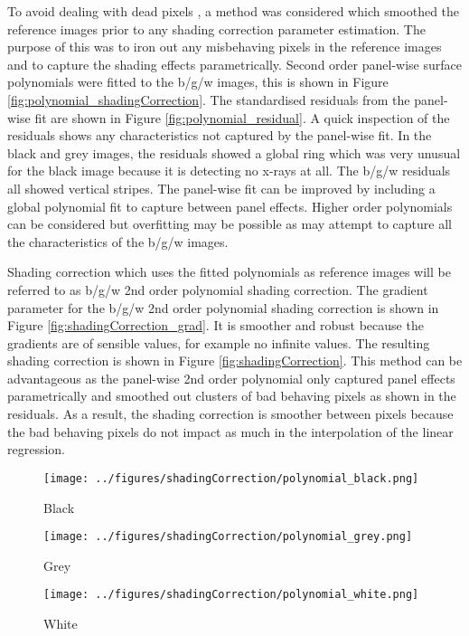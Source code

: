 \documentclass[a4paper]{proc}
\begin{document}
To avoid dealing with dead pixels \cite{brettschneider2014spatial}, a method was considered which smoothed the reference images prior to any shading correction parameter estimation. The purpose of this was to iron out any misbehaving pixels in the reference images and to capture the shading effects parametrically. Second order panel-wise surface polynomials were fitted to the b/g/w images, this is shown in Figure \ref{fig:polynomial_shadingCorrection}. The standardised residuals from the panel-wise fit are shown in Figure \ref{fig:polynomial_residual}. A quick inspection of the residuals shows any characteristics not captured by the panel-wise fit. In the black and grey images, the residuals showed a global ring which was very unusual for the black image because it is detecting no x-rays at all. The b/g/w residuals all showed vertical stripes. The panel-wise fit can be improved by including a global polynomial fit to capture between panel effects. Higher order polynomials can be considered but overfitting may be possible as may attempt to capture all the characteristics of the b/g/w images.

Shading correction which uses the fitted polynomials as reference images will be referred to as b/g/w 2nd order polynomial shading correction. The gradient parameter for the b/g/w 2nd order polynomial shading correction is shown in Figure \ref{fig:shadingCorrection_grad}. It is smoother and robust because the gradients are of sensible values, for example no infinite values. The resulting shading correction is shown in Figure \ref{fig:shadingCorrection}. This method can be advantageous as the panel-wise 2nd order polynomial only captured panel effects parametrically and smoothed out clusters of bad behaving pixels as shown in the residuals. As a result, the shading correction is smoother between pixels because the bad behaving pixels do not impact as much in the interpolation of the linear regression.

\begin{figure*}
	\centering
	\begin{subfigure}{0.45\textwidth}
		\centering
		\texttt{[image: ../figures/shadingCorrection/polynomial\_black.png]}
		\caption{Black}
	\end{subfigure}
	\begin{subfigure}{0.45\textwidth}
		\centering
		\texttt{[image: ../figures/shadingCorrection/polynomial\_grey.png]}
		\caption{Grey}
	\end{subfigure}
	\begin{subfigure}{0.45\textwidth}
		\centering
		\texttt{[image: ../figures/shadingCorrection/polynomial\_white.png]}
		\caption{White}
	\end{subfigure}
	\caption{Second order panel-wise surface polynomials fit on the reference images.}
	\label{fig:polynomial_shadingCorrection}
\end{figure*}
\end{document}
